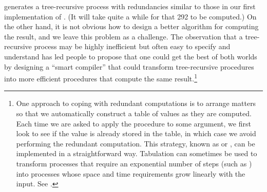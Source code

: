 \noindent
{} generates a tree-recursive process with redundancies
similar to those in our first implementation of .  (It will take
quite a while for that 292 to be computed.)  On the other hand, it is not
obvious how to design a better algorithm for computing the result, and we leave
this problem as a challenge.  The observation that a tree-recursive process may
be highly inefficient but often easy to specify and understand has led people
to propose that one could get the best of both worlds by designing a ``smart
compiler'' that could transform tree-recursive procedures into more efficient
procedures that compute the same result.\footnote{One approach to coping with
redundant computations is to arrange matters so that we automatically construct
a table of values as they are computed.  Each time we are asked to apply the
procedure to some argument, we first look to see if the value is already stored
in the table, in which case we avoid performing the redundant computation.
This strategy, known as  or , can be
implemented in a straightforward way.  Tabulation can sometimes be used to
transform processes that require an exponential number of steps (such as
) into processes whose space and time requirements grow
linearly with the input.  See .}

